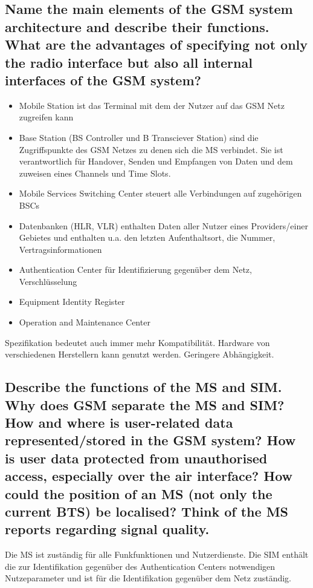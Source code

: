 \subsection{Name the main elements of the GSM system architecture and describe their functions. What are the advantages of specifying not only the radio interface but also all internal interfaces of the GSM system?}
\begin{itemize}
\item Mobile Station ist das Terminal mit dem der Nutzer auf das GSM Netz zugreifen kann

\item Base Station (BS Controller und B Transciever Station) sind die Zugriffspunkte des GSM Netzes zu denen sich die MS verbindet. Sie ist verantwortlich für Handover, Senden und Empfangen von Daten und dem zuweisen eines Channels und Time Slots.

\item Mobile Services Switching Center steuert alle Verbindungen auf zugehörigen BSCs

\item Datenbanken (HLR, VLR) enthalten Daten aller Nutzer eines Providers/einer Gebietes und enthalten u.a. den letzten Aufenthaltsort, die Nummer, Vertragsinformationen

\item Authentication Center für Identifizierung gegenüber dem Netz, Verschlüsselung

\item Equipment Identity Register 

\item Operation and Maintenance Center 
\end{itemize}

Spezifikation bedeutet auch immer mehr Kompatibilität. Hardware von verschiedenen Herstellern kann genutzt werden. Geringere Abhängigkeit.


\subsection{Describe the functions of the MS and SIM. Why does GSM separate the MS and SIM? How and where is user-related data represented/stored in the GSM system? How is user data protected from unauthorised access, especially over the air interface? How could the position of an MS (not only the current BTS) be localised? Think of the MS reports regarding signal quality.}

Die MS ist zuständig für alle Funkfunktionen und Nutzerdienste.
Die SIM enthält die zur Identifikation gegenüber des Authentication Centers notwendigen Nutzeparameter und ist für die Identifikation gegenüber dem Netz zuständig.


